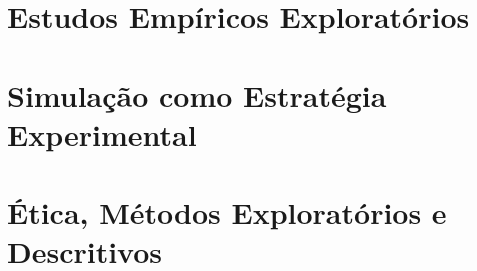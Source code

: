 \documentclass[12pt]{book}
\begin{document}
    

    

    

    

    

%
    
\part{Estudos Empíricos Exploratórios\label{part:estudos:exploratorios}}

    

    

    

\part{Simulação como Estratégia Experimental\label{part:simulacao:experimental}}

    

    

    

    

    

    

\part{Ética, Métodos Exploratórios e Descritivos\label{part:etica:estudocaso:survey}}

    





\label{referencias}
    \printbibliography
\end{document}
